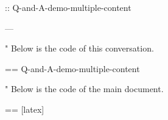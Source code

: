 \documentclass[%
  numbered question,
  numbered answer,
  enlarge left margin by = .5cm,
  scroll,
]{Q-and-A}
\begin{document}
:: {Q-and-A-demo-multiple-content}


---

"
  Below is the code of this conversation.

  == {Q-and-A-demo-multiple-content}

"
  Below is the code of the main document.

  == [latex] {\jobname}
\end{document}
